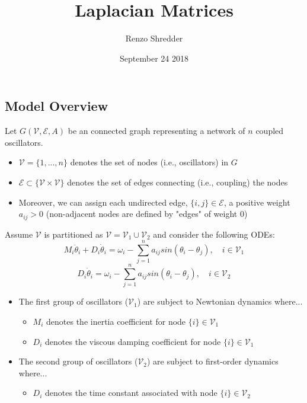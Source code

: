 \documentclass[a4paper]{article}
\title{Laplacian Matrices}
\author{Renzo Shredder}
\date{September 24 2018}
\begin{document}
\maketitle
\section*{} 
\subsection*{Model Overview}
Let $G(\mathcal{V},\mathcal{E},A)$ be an connected graph representing a network of $n$ coupled oscillators. 
\begin{itemize}
    \item $\mathcal{V} = \{1,...,n\}$ denotes the set of nodes (i.e., oscillators) in $G$
    \item $\mathcal{E} \subset \{\mathcal{V} \times \mathcal{V}\}$ denotes the set of edges connecting (i.e., coupling) the nodes 
    \item Moreover, we can assign each undirected edge, $\{ i, j\} \in \mathcal{E}$, a positive weight $a_{ij}>0$ (non-adjacent nodes are defined by "edges" of weight 0) 
\end{itemize}
Assume $\mathcal{V}$ is partitioned as $\mathcal{V} = \mathcal{V}_{1} \cup \mathcal{V}_{2}$ and consider the following ODEs:
    \begin{equation}
        M_i \ddot{\theta}_i + D_i \dot{\theta}_i = \omega_i - \sum_{j=1}^{n}{a_{ij} sin(\theta_i - \theta_j)}, \quad i \in \mathcal{V}_1
    \end{equation}
    \begin{equation}
        D_i \dot{\theta}_i = \omega_i - \sum_{j=1}^{n}{a_{ij} sin(\theta_i - \theta_j)}, \quad i \in \mathcal{V}_2
    \end{equation}
    \begin{itemize}
        \item The first group of oscillators ($\mathcal{V}_1$) are subject to Newtonian dynamics where...
            \begin{itemize}
                \item $M_{i}$ denotes the inertia coefficient for node $\{i\} \in \mathcal{V}_1$
                \item $D_{i}$ denotes the viscous damping coefficient for node $\{i\} \in \mathcal{V}_1$
            \end{itemize}
        \item The second group of oscillators ($\mathcal{V}_2$) are subject to first-order dynamics where...
        \begin{itemize}
            \item $D_{i}$ denotes the time constant associated with node $\{i\} \in \mathcal{V}_2$
        \end{itemize}
    \end{itemize}
\section*{}

 
\end{document}
